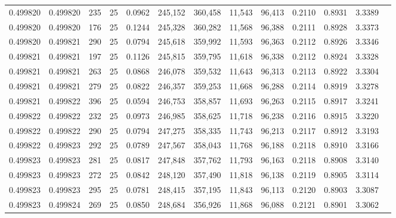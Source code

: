 \begin{tabular}{rrrrrrrrrrrrr}
0.499820 & 0.499820 &   235 &  25 &                                     0.0962 & 245,152 & 360,458 &  11,543 &  96,413 & 0.2110 & 0.8931 & 3.3389 \\
0.499820 & 0.499820 &   176 &  25 &                                     0.1244 & 245,328 & 360,282 &  11,568 &  96,388 & 0.2111 & 0.8928 & 3.3373 \\
0.499820 & 0.499821 &   290 &  25 &                                     0.0794 & 245,618 & 359,992 &  11,593 &  96,363 & 0.2112 & 0.8926 & 3.3346 \\
0.499821 & 0.499821 &   197 &  25 &                                     0.1126 & 245,815 & 359,795 &  11,618 &  96,338 & 0.2112 & 0.8924 & 3.3328 \\
0.499821 & 0.499821 &   263 &  25 &                                     0.0868 & 246,078 & 359,532 &  11,643 &  96,313 & 0.2113 & 0.8922 & 3.3304 \\
0.499821 & 0.499821 &   279 &  25 &                                     0.0822 & 246,357 & 359,253 &  11,668 &  96,288 & 0.2114 & 0.8919 & 3.3278 \\
0.499821 & 0.499822 &   396 &  25 &                                     0.0594 & 246,753 & 358,857 &  11,693 &  96,263 & 0.2115 & 0.8917 & 3.3241 \\
0.499822 & 0.499822 &   232 &  25 &                                     0.0973 & 246,985 & 358,625 &  11,718 &  96,238 & 0.2116 & 0.8915 & 3.3220 \\
0.499822 & 0.499822 &   290 &  25 &                                     0.0794 & 247,275 & 358,335 &  11,743 &  96,213 & 0.2117 & 0.8912 & 3.3193 \\
0.499822 & 0.499823 &   292 &  25 &                                     0.0789 & 247,567 & 358,043 &  11,768 &  96,188 & 0.2118 & 0.8910 & 3.3166 \\
0.499823 & 0.499823 &   281 &  25 &                                     0.0817 & 247,848 & 357,762 &  11,793 &  96,163 & 0.2118 & 0.8908 & 3.3140 \\
0.499823 & 0.499823 &   272 &  25 &                                     0.0842 & 248,120 & 357,490 &  11,818 &  96,138 & 0.2119 & 0.8905 & 3.3114 \\
0.499823 & 0.499823 &   295 &  25 &                                     0.0781 & 248,415 & 357,195 &  11,843 &  96,113 & 0.2120 & 0.8903 & 3.3087 \\
0.499823 & 0.499824 &   269 &  25 &                                     0.0850 & 248,684 & 356,926 &  11,868 &  96,088 & 0.2121 & 0.8901 & 3.3062 \\

\end{tabular}
